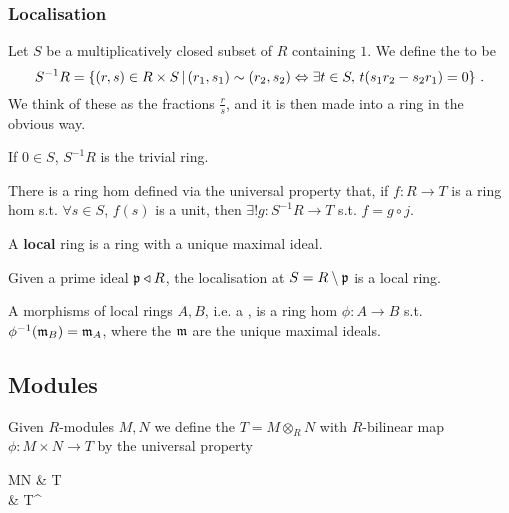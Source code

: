 \documentclass{article}
\begin{document}
\subsubsection{Localisation}

\begin{definition}
	Let $S$ be a multiplicatively closed subset of $R$ containing $1$. We define the  to be 
	\[
	S^{-1} R = \left\{ (r,s) \in R \times S \, | \, (r_1, s_1) \sim (r_2, s_2) \Leftrightarrow \exists t \in S, \, t(s_1 r_2 - s_2 r_1)=0 \right\} \, .
	\]
	We think of these as the fractions $\frac{r}{s}$, and it is then made into a ring in the obvious way. 
\end{definition}

\begin{prop}
	If $0 \in S$, $S^{-1}R$ is the trivial ring. 
\end{prop}

\begin{prop}
	There is a ring hom 
defined via the universal property that, if $f:R \to T$ is a ring hom s.t. $\forall s \in S$, $f(s)$ is a unit, then $\exists! g: S^{-1}R \to T$ s.t. $f = g \circ j$. 
\end{prop}

\begin{definition}
	A \textbf{local} ring is a ring with a unique maximal ideal. 
\end{definition}

\begin{prop}
	Given a prime ideal $\mathfrak{p} \triangleleft R$, the localisation at $S=R\setminus \mathfrak{p}$ is a local ring. 
\end{prop}

\begin{definition}
	A morphisms of local rings $A, B$, i.e. a , is a ring hom $\phi : A \to B$ s.t. $\phi^{-1}(\mathfrak{m}_B) = \mathfrak{m}_A$, where the $\mathfrak{m}$ are the unique maximal ideals.  
\end{definition}
\subsection{Modules}
\begin{definition}
	Given $R$-modules $M,N$ we define the  $T= M \otimes_R N$ with $R$-bilinear map $\phi:M\times N \to T$ by the universal property
	\begin{tkz}
		M\times N \arrow[r,"\phi"]  & T \\ & T^\prime  
	\end{tkz}
\end{definition}
\end{document}
